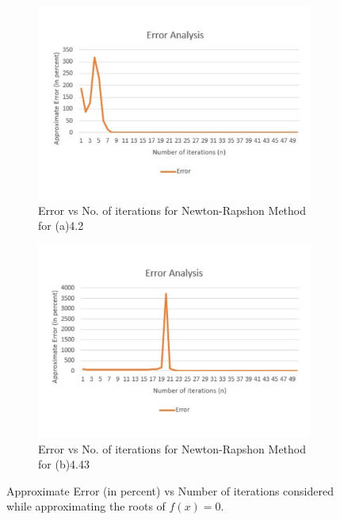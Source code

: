 \documentclass[titlepage, 11pt]{article}
\begin{document}
\begin{figure}[ht]
\begin{subfigure}{.5\textwidth}
  \centering
  \includegraphics[width=\linewidth]{ErrorP2a.pdf}
  \caption{Error vs No. of iterations for Newton-Rapshon Method for (a)4.2}
  \label{fig:fig4a}
\end{subfigure}
\begin{subfigure}{.5\textwidth}
  \centering
  \includegraphics[width=\linewidth]{ErrorP2b.pdf}
  \caption{Error vs No. of iterations for Newton-Rapshon Method for (b)4.43}
  \label{fig:fig4b}
\end{subfigure}
\caption{Approximate Error (in percent) vs Number of iterations considered while approximating the roots of $f(x)=0$.}
\label{fig:q2}
\end{figure}
\end{document}
